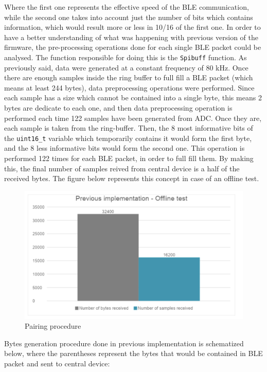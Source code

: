\documentclass{Configuration_Files/PoliMi3i_thesis}
\begin{document}
Where the first one represents the effective speed of the BLE communication, while the second one takes into account just the number of bits which contains information, which would result more or less in 10/16 of the first one. In order to have a better understanding of what was happening with previous version of the firmware, the pre-processing operations done for each single BLE packet could be analysed. The function responsible for doing this is the \texttt{Spibuff} function. As previously said, data were generated at a constant frequency of 80 kHz. Once there are enough samples inside the ring buffer to full fill a BLE packet (which means at least 244 bytes), data preprocessing operations were performed. Since each sample has a size which cannot be contained into a single byte, this means 2 bytes are dedicate to each one, and then data preprocessing operation is performed each time 122 samples have been generated from ADC. Once they are, each sample is taken from the ring-buffer. Then, the 8 most informative bits of the \texttt{uint16\_t} variable which temporarily contains it would form the first byte, and the 8 less informative bits would form the second one. This operation is performed 122 times for each BLE packet, in order to full fill them. By making this, the final number of samples reived from central device is a half of the received bytes. The figure below represents this concept in case of an offline test.

\begin{figure}[H]
    \centering
    \includegraphics[scale=0.7]{Shift Algorithm/Screenshot 2024-07-22 at 22.31.21.png}
    \caption{Pairing procedure}
    \label{pairing_procedure_2}
\end{figure}

Bytes generation procedure done in previous implementation is schematized below, where the parentheses represent the bytes that would be contained in BLE packet and sent to central device:
\end{document}
